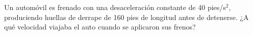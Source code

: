 \item Un automóvil es frenado con una desaceleración constante de 40 pies/s$^2$, produciendo huellas de derrape de 160 pies de longitud antes de detenerse. ¿A qué velocidad viajaba el auto cuando se aplicaron sus frenos?

